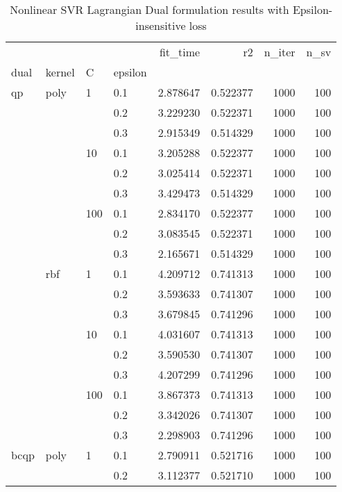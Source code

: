 \begin{table}[H]
\centering
\caption{Nonlinear SVR Lagrangian Dual formulation results with Epsilon-insensitive loss}
\label{nonlinear_lagrangian_dual_svr_cv_results}
\begin{tabular}{llllrrrr}
\toprule
     &     &     &     &  fit\_time &        r2 &  n\_iter &  n\_sv \\
dual & kernel & C & epsilon &           &           &         &       \\
\midrule
qp & poly & 1   & 0.1 &  2.878647 &  0.522377 &    1000 &   100 \\
     &     &     & 0.2 &  3.229230 &  0.522371 &    1000 &   100 \\
     &     &     & 0.3 &  2.915349 &  0.514329 &    1000 &   100 \\
     &     & 10  & 0.1 &  3.205288 &  0.522377 &    1000 &   100 \\
     &     &     & 0.2 &  3.025414 &  0.522371 &    1000 &   100 \\
     &     &     & 0.3 &  3.429473 &  0.514329 &    1000 &   100 \\
     &     & 100 & 0.1 &  2.834170 &  0.522377 &    1000 &   100 \\
     &     &     & 0.2 &  3.083545 &  0.522371 &    1000 &   100 \\
     &     &     & 0.3 &  2.165671 &  0.514329 &    1000 &   100 \\
     & rbf & 1   & 0.1 &  4.209712 &  0.741313 &    1000 &   100 \\
     &     &     & 0.2 &  3.593633 &  0.741307 &    1000 &   100 \\
     &     &     & 0.3 &  3.679845 &  0.741296 &    1000 &   100 \\
     &     & 10  & 0.1 &  4.031607 &  0.741313 &    1000 &   100 \\
     &     &     & 0.2 &  3.590530 &  0.741307 &    1000 &   100 \\
     &     &     & 0.3 &  4.207299 &  0.741296 &    1000 &   100 \\
     &     & 100 & 0.1 &  3.867373 &  0.741313 &    1000 &   100 \\
     &     &     & 0.2 &  3.342026 &  0.741307 &    1000 &   100 \\
     &     &     & 0.3 &  2.298903 &  0.741296 &    1000 &   100 \\
bcqp & poly & 1   & 0.1 &  2.790911 &  0.521716 &    1000 &   100 \\
     &     &     & 0.2 &  3.112377 &  0.521710 &    1000 &   100 \\

\end{tabular}
\end{table}
